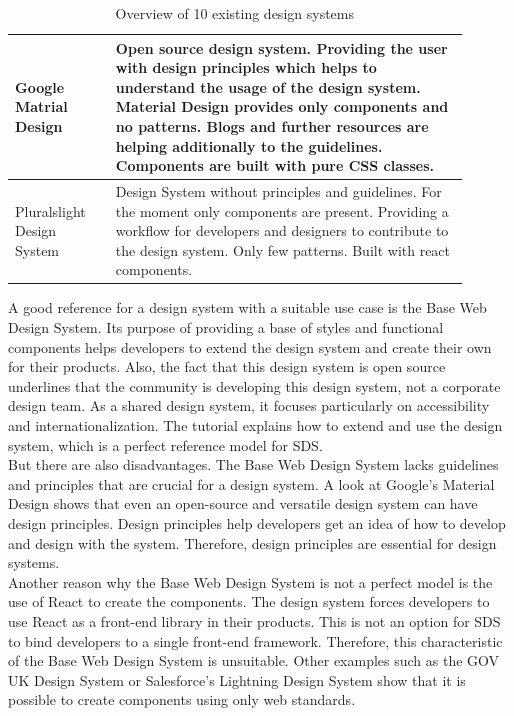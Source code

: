 \begin{table}[!ht]
\begin{tabular}{|p{0.2\linewidth} | p{0.7\linewidth}|}
Google Matrial Design \cite{google_material_2022} & Open source design system. Providing the user with design principles which helps to understand the usage of the design system. Material Design provides only components and no patterns. Blogs and further resources are helping additionally to the guidelines. Components are built with pure CSS classes. \\ \hline
Pluralslight Design System \cite{pluralsight_ds_nodate} & Design System without principles and guidelines. For the moment only components are present. Providing a workflow for developers and designers to contribute to the design system.  Only few patterns. Built with react components.  \\ \hline
\end{tabular}
\caption{\label{tab:design_systems_in_the_wild} Overview of 10 existing design systems}
\end{table}

A good reference for a design system with a suitable use case is the Base Web Design System. Its purpose of providing a base of styles and functional components helps developers to extend the design system and create their own for their products. Also, the fact that this design system is open source underlines that the community is developing this design system, not a corporate design team. As a shared design system, it focuses particularly on accessibility and internationalization. The tutorial explains how to extend and use the design system, which is a perfect reference model for \ac{SDS}. \\

But there are also disadvantages. The Base Web Design System lacks guidelines and principles that are crucial for a design system.
A look at Google's Material Design shows that even an open-source and versatile design system can have design principles. Design principles help developers get an idea of how to develop and design with the system. Therefore, design principles are essential for design systems. \\

Another reason why the Base Web Design System is not a perfect model is the use of React to create the components. The design system forces developers to use React as a front-end library in their products. This is not an option for SDS to bind developers to a single front-end framework. Therefore, this characteristic of the Base Web Design System is unsuitable. Other examples such as the GOV UK Design System or Salesforce's Lightning Design System show that it is possible to create components using only web standards. \\


